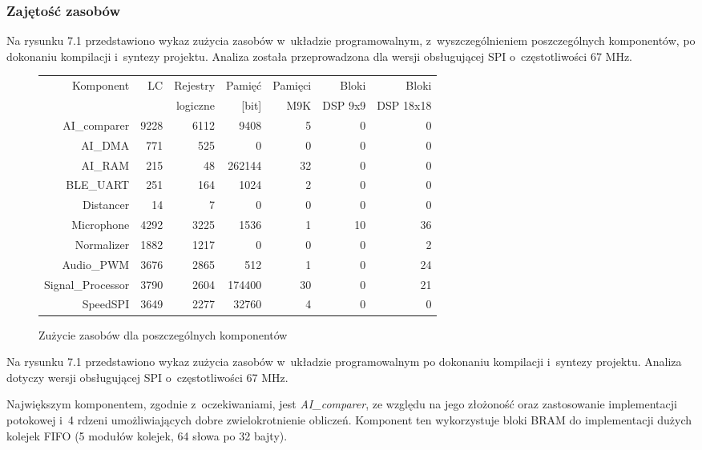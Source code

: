 \subsubsection{Zajętość zasobów}
Na rysunku 7.1 przedstawiono wykaz zużycia zasobów w~układzie programowalnym, z~wyszczególnieniem poszczególnych komponentów, po dokonaniu kompilacji i~syntezy projektu. Analiza została przeprowadzona dla wersji obsługującej SPI o~częstotliwości 67 MHz.

 \begin{figure}[h]
	\centering
	\begin{tabular}{|r|r|r|r|r|r|r|}
		\hline
		Komponent & LC  & Rejestry & Pamięć & Pamięci & Bloki & Bloki \\
				  &     & logiczne & [bit]	& M9K		& DSP 9x9 &	DSP 18x18\\
		\hline
		AI\_comparer 		& 9228 & 6112 & 9408 & 5 & 0 & 0\\
		AI\_DMA		 		& 771 & 525 & 0 & 0 & 0 & 0\\	
		AI\_RAM				& 215 & 48 & 262144 & 32 & 0 & 0 \\
		BLE\_UART	 		& 251 & 164 & 1024 & 2 & 0 & 0\\
		Distancer    		& 14 & 7 & 0 & 0 & 0 & 0\\
		Microphone   		& 4292 & 3225 & 1536 & 1 & 10 & 36 \\
		Normalizer  	    & 1882 & 1217 & 0 & 0 & 0 & 2\\
		Audio\_PWM   		& 3676 & 2865 & 512 & 1 & 0 & 24 \\
		Signal\_Processor   & 3790 & 2604 & 174400 & 30 & 0 & 21\\
		SpeedSPI		    & 3649 & 2277 & 32760 & 4 & 0 & 0\\
		\hline
	\end{tabular}
	
	\caption{Zużycie zasobów dla poszczególnych komponentów}
\end{figure}
\FloatBarrier %

Na rysunku 7.1 przedstawiono wykaz zużycia zasobów w~układzie programowalnym po dokonaniu kompilacji i~syntezy projektu. Analiza dotyczy wersji obsługującej SPI o~częstotliwości 67 MHz.

Największym komponentem, zgodnie z~oczekiwaniami, jest \textit{AI\_comparer}, ze względu na jego złożoność oraz zastosowanie implementacji potokowej i~4 rdzeni umożliwiających dobre zwielokrotnienie obliczeń. Komponent ten wykorzystuje bloki BRAM do implementacji dużych kolejek FIFO (5 modułów kolejek, 64 słowa po 32 bajty).


